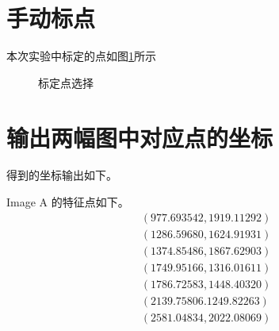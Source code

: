 \documentclass[UTF8]{ctexart}
\begin{document}
\section{手动标点}

本次实验中标定的点如图\ref{interest_point_selection}所示

\begin{figure}[h!]
	\centering
	\hspace{0.1in} 	
	\caption{标定点选择} 
	\label{interest_point_selection} %
\end{figure}

\section{输出两幅图中对应点的坐标}

得到的坐标输出如下。

Image A 的特征点如下。
\[ \begin{array}{cc}
	\left(977.693542 , 1919.11292\right) \\
	\left(1286.59680 , 1624.91931\right) \\
	\left(1374.85486 , 1867.62903\right) \\
	\left(1749.95166 , 1316.01611\right) \\
	\left(1786.72583 , 1448.40320\right) \\
	\left(2139.75806 . 1249.82263\right) \\
	\left(2581.04834 , 2022.08069\right) 
\end{array} \]
\end{document}
